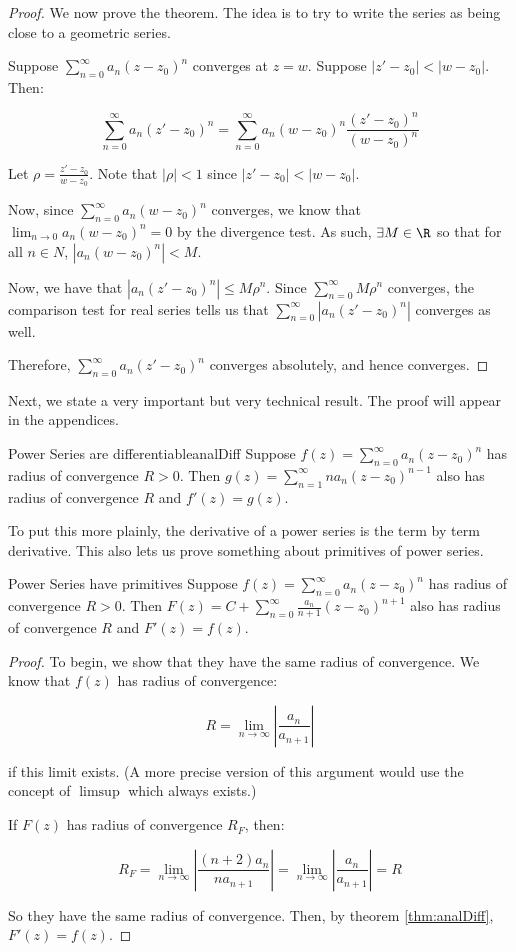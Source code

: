 \begin{proof}We now prove the theorem. The idea is to try to write the series as being close to a geometric series.

Suppose $\sum_{n=0}^\infty a_n(z-z_0)^n$ converges at $z = w$. Suppose $|z' - z_0| < |w-z_0|$. Then:

$$\sum_{n = 0}^\infty a_n(z'-z_0)^n = \sum_{n = 0}^\infty a_n(w-z_0)^n \frac{(z'-z_0)^n}{(w-z_0)^n}$$

Let $\rho = \frac{z'-z_0}{w-z_0}$. Note that $|\rho| < 1$ since $|z'-z_0| < |w-z_0|$.

Now, since $\sum_{n=0}^\infty a_n(w-z_0)^n$ converges, we know that $\lim_{n\rightarrow 0} a_n(w-z_0)^n = 0$ by the divergence test. As such, $\exists M\in \R$ so that for all $n\in N$, $|a_n(w-z_0)^n| < M$.

Now, we have that $|a_n(z'-z_0)^n| \le M\rho^n$. Since $\sum_{n = 0}^\infty M\rho^n$ converges, the comparison test for real series tells us that $\sum_{n = 0}^\infty |a_n(z'-z_0)^n|$ converges as well.

Therefore, $\sum_{n = 0}^\infty a_n(z'-z_0)^n$ converges absolutely, and hence converges.
\end{proof}

Next, we state a very important but very technical result. The proof will appear in the appendices.

\begin{thmbo}{Power Series are differentiable}{analDiff} Suppose $f(z) = \sum_{n = 0}^\infty a_n(z-z_0)^n$ has radius of convergence $R> 0$. Then $g(z) = \sum_{n=1}^\infty na_n(z-z_0)^{n-1}$ also has radius of convergence $R$ and $f'(z) = g(z)$.
\end{thmbo}

To put this more plainly, the derivative of a power series is the term by term derivative. This also lets us prove something about primitives of power series.

\begin{thmbo}{Power Series have primitives}{} Suppose $f(z) = \sum_{n = 0}^\infty a_n(z-z_0)^n$ has radius of convergence $R> 0$. Then $F(z) = C + \sum_{n=0}^\infty \frac{a_n}{n+1}(z-z_0)^{n+1}$ also has radius of convergence $R$ and $F'(z) = f(z)$.
\end{thmbo}

\begin{proof} To begin, we show that they have the same radius of convergence. We know that $f(z)$ has radius of convergence:

$$R = \lim_{n\rightarrow \infty} \left|\frac{a_n}{a_{n+1}}\right|$$

\noin if this limit exists. (A more precise version of this argument would use the concept of $\limsup$ which always exists.)

If $F(z)$ has radius of convergence $R_F$, then:

$$R_F = \lim_{n\rightarrow \infty} \left|\frac{(n+2)a_n}{na_{n+1}}\right| = \lim_{n\rightarrow \infty} \left|\frac{a_n}{a_{n+1}}\right| = R$$

So they have the same radius of convergence. Then, by theorem \ref{thm:analDiff}, $F'(z) = f(z)$.
\end{proof}

